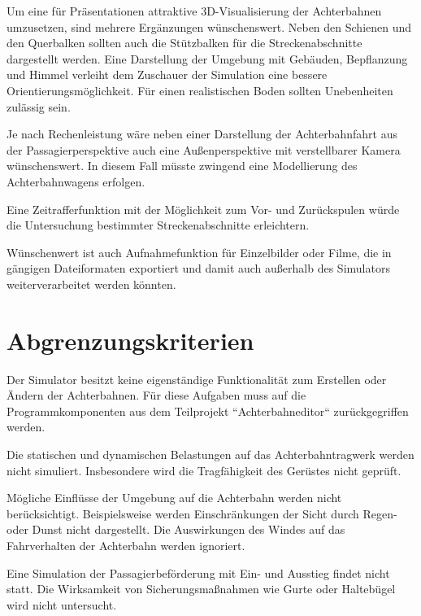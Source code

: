 Um eine für Präsentationen attraktive 3D-Visualisierung der Achterbahnen umzusetzen, sind mehrere Ergänzungen wünschenswert. Neben den Schienen und den Querbalken sollten auch die Stützbalken für die Streckenabschnitte dargestellt werden. Eine Darstellung der Umgebung mit Gebäuden, Bepflanzung und Himmel verleiht dem Zuschauer der Simulation eine bessere Orientierungsmöglichkeit. Für einen realistischen Boden sollten Unebenheiten zulässig sein.

Je nach Rechenleistung wäre neben einer Darstellung der Achterbahnfahrt aus der Passagierperspektive auch eine Außenperspektive mit verstellbarer Kamera wünschenswert. In diesem Fall müsste zwingend eine Modellierung des Achterbahnwagens erfolgen.

Eine Zeitrafferfunktion mit der Möglichkeit zum Vor- und Zurückspulen würde die Untersuchung bestimmter Streckenabschnitte erleichtern.

Wünschenwert ist auch Aufnahmefunktion für Einzelbilder oder Filme, die in gängigen Dateiformaten exportiert und damit auch außerhalb des Simulators weiterverarbeitet werden könnten.

\section{Abgrenzungskriterien}
Der Simulator besitzt keine eigenständige Funktionalität zum Erstellen oder Ändern der Achterbahnen. Für diese Aufgaben muss auf die Programmkomponenten aus dem Teilprojekt ``Achterbahneditor`` zurückgegriffen werden.

Die statischen und dynamischen Belastungen auf das Achterbahntragwerk werden nicht simuliert. Insbesondere wird die Tragfähigkeit des Gerüstes nicht geprüft.

Mögliche Einflüsse der Umgebung auf die Achterbahn werden nicht berücksichtigt. Beispielsweise werden Einschränkungen der Sicht durch Regen- oder Dunst nicht dargestellt. Die Auswirkungen des Windes auf das Fahrverhalten der Achterbahn werden ignoriert.

Eine Simulation der Passagierbeförderung mit Ein- und Ausstieg findet nicht statt. Die Wirksamkeit von Sicherungsmaßnahmen wie Gurte oder Haltebügel wird nicht untersucht. 
